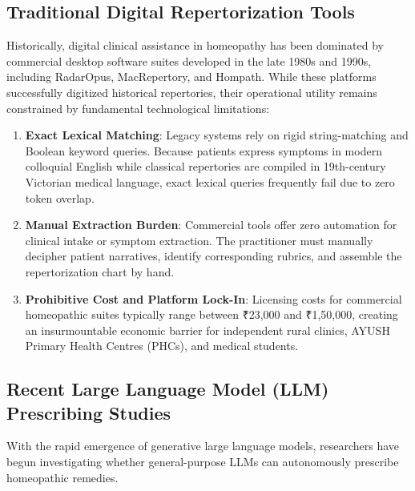 \begin{sloppypar}
\subsection{Traditional Digital Repertorization Tools}
Historically, digital clinical assistance in homeopathy has been dominated by commercial desktop software suites developed in the late 1980s and 1990s, including RadarOpus, MacRepertory, and Hompath. While these platforms successfully digitized historical repertories, their operational utility remains constrained by fundamental technological limitations:
\begin{enumerate}
    \item \textbf{Exact Lexical Matching}: Legacy systems rely on rigid string-matching and Boolean keyword queries. Because patients express symptoms in modern colloquial English while classical repertories are compiled in 19th-century Victorian medical language, exact lexical queries frequently fail due to zero token overlap.
    \item \textbf{Manual Extraction Burden}: Commercial tools offer zero automation for clinical intake or symptom extraction. The practitioner must manually decipher patient narratives, identify corresponding rubrics, and assemble the repertorization chart by hand.
    \item \textbf{Prohibitive Cost and Platform Lock-In}: Licensing costs for commercial homeopathic suites typically range between ₹23,000 and ₹1,50,000, creating an insurmountable economic barrier for independent rural clinics, AYUSH Primary Health Centres (PHCs), and medical students.
\end{enumerate}

\subsection{Recent Large Language Model (LLM) Prescribing Studies}
With the rapid emergence of generative large language models, researchers have begun investigating whether general-purpose LLMs can autonomously prescribe homeopathic remedies. 


\end{sloppypar}
